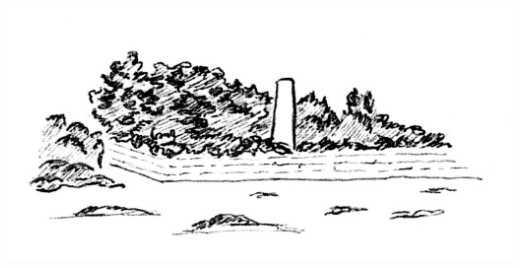 \begin{titlepage}
	{\includegraphics[scale=1.]{tourBlanche_calque-seul2}}
	
	
	
	
	
	
\end{titlepage}
